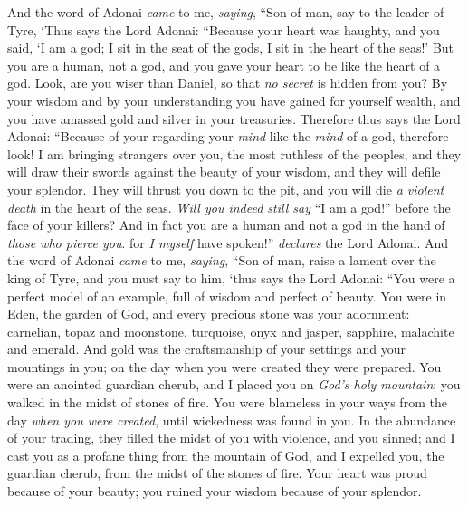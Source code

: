 \begin{biblechapter} %
 And the word of Adonai \textit{came} to me, \textit{saying},
\verse “Son of man, say to the leader of Tyre, ‘Thus says the Lord Adonai:
\verse “Because your heart was haughty, 
and you said, ‘I am a god; 
I sit in the seat of the gods, 
I sit in the heart of the seas!’ 
But you are a human, not a god, 
and you gave your heart to be like the heart of a god.
\verse Look, are you wiser than Daniel, 
so that \textit{no secret} is hidden from you?
\verse By your wisdom and by your understanding 
you have gained for yourself wealth, 
and you have amassed gold and silver 
in your treasuries.
\verse Therefore thus says the Lord Adonai:
\verse “Because of your regarding your \textit{mind} 
like the \textit{mind} of a god,
\verse therefore look! I am bringing strangers over you, 
the most ruthless of the peoples, 
and they will draw their swords against the beauty of your wisdom, 
and they will defile your splendor.
\verse They will thrust you down to the pit, 
and you will die \textit{a violent death} 
in the heart of the seas.
\verse \textit{Will you indeed still say} “I am a god!” 
before the face of your killers? 
And in fact you are a human and not a god 
in the hand of \textit{those who pierce you}. for \textit{I myself} have spoken!” \textit{declares} the Lord Adonai.
\verse And the word of Adonai \textit{came} to me, \textit{saying},
\verse “Son of man, raise a lament over the king of Tyre, and you must say to him, ‘thus says the Lord Adonai:
\verse “You were a perfect model of an example, 
full of wisdom and perfect of beauty.
\verse You were in Eden, the garden of God, 
and every precious stone was your adornment: 
carnelian, topaz and moonstone, 
turquoise, onyx and jasper, 
sapphire, malachite and emerald. 
And gold was the craftsmanship of your settings 
and your mountings in you; 
on the day when you were created they were prepared.
\verse You were an anointed guardian cherub, 
and I placed you on \textit{God’s holy mountain}; 
you walked in the midst of stones of fire.
\verse You were blameless in your ways 
from the day \textit{when you were created}, 
until wickedness was found in you.
\verse In the abundance of your trading, 
they filled the midst of you with violence, and you sinned; 
and I cast you as a profane thing from the mountain of God, 
and I expelled you, the guardian cherub, 
from the midst of the stones of fire.
\verse Your heart was proud because of your beauty; 
you ruined your wisdom because of your splendor. 

\end{biblechapter}
